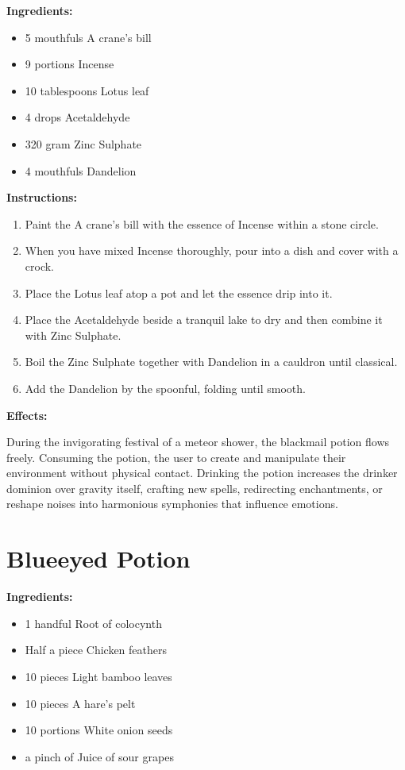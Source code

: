 \documentclass{article}
\begin{document}
\textbf{Ingredients:}

\begin{itemize}
  \item 5 mouthfuls A crane's bill
  \item 9 portions Incense
  \item 10 tablespoons Lotus leaf
  \item 4 drops Acetaldehyde
  \item 320 gram Zinc Sulphate
  \item 4 mouthfuls Dandelion
\end{itemize}

\textbf{Instructions:}

\begin{enumerate}
  \item Paint the A crane's bill with the essence of Incense within a stone circle.
  \item When you have mixed Incense thoroughly, pour into a dish and cover with a crock.
  \item Place the Lotus leaf atop a pot and let the essence drip into it.
  \item Place the Acetaldehyde beside a tranquil lake to dry and then combine it with Zinc Sulphate.
  \item Boil the Zinc Sulphate together with Dandelion in a cauldron until classical.
  \item Add the Dandelion by the spoonful, folding until smooth.
\end{enumerate}

\textbf{Effects:}

During the invigorating festival of a meteor shower, the blackmail potion flows freely. Consuming the potion, the user to create and manipulate their environment without physical contact. Drinking the potion increases the drinker dominion over gravity itself, crafting new spells, redirecting enchantments, or reshape noises into harmonious symphonies that influence emotions.

\newpage
\section*{Blueeyed Potion}

\textbf{Ingredients:}

\begin{itemize}
  \item 1 handful Root of colocynth
  \item Half a piece Chicken feathers
  \item 10 pieces Light bamboo leaves
  \item 10 pieces A hare's pelt
  \item 10 portions White onion seeds
  \item a pinch of Juice of sour grapes
\end{itemize}
\end{document}
